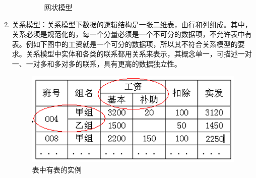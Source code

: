 \documentclass[main.tex]{subfiles}
\begin{document}
\begin{enumerate}
\begin{enumerate}
\begin{figure}[H]
                    \caption{网状模型}
                \end{figure}
        \end{enumerate}
    \item 关系模型：关系模型下数据的逻辑结构是一张二维表，由行和列组成。其中，关系必须是规范化的，每一个分量必须是一个不可分的数据项，不允许表中有表。例如下图中的工资就是一个可分的数据项，所以其不符合关系模型的要求。关系模型中实体和各类的联系都用关系来表示，其概念单一，可描述一对一、一对多和多对多的联系，具有更高的数据独立性。
        \begin{figure}
            \centering
            \includegraphics[scale=0.5]{./images/0022.png}
            \caption{表中有表的实例}
        \end{figure}
\end{enumerate}
\end{document}
